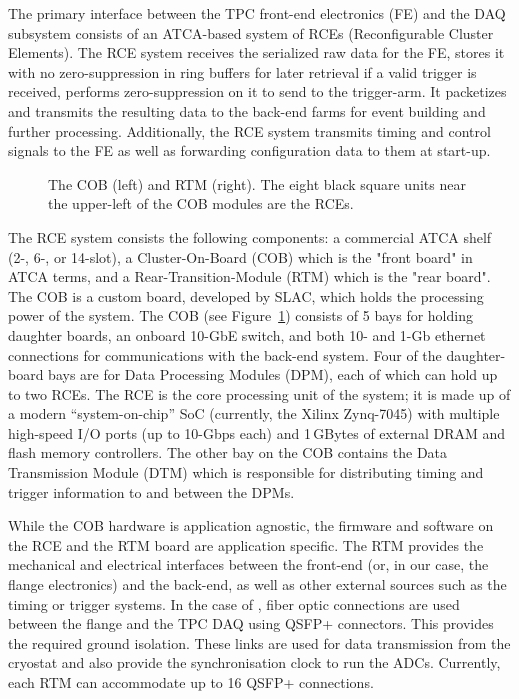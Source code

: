 The primary interface between the TPC front-end electronics (FE) and
the DAQ subsystem consists of an ATCA-based system of RCEs
(Reconfigurable Cluster Elements).  The RCE system receives the
serialized raw data for the FE, stores it with no zero-suppression in 
ring buffers for later retrieval if a valid trigger is received, performs 
zero-suppression on it to send to the trigger-arm.  It packetizes and 
transmits the resulting data to the back-end
farms for event building and further processing.  Additionally,
the RCE system transmits timing and control signals to the FE as well
as forwarding configuration data to them at start-up.

\begin{figure}[hbt]
\begin{center}
  \caption{\label{fig:daq15_cob} The COB (left) and RTM (right). The eight black square units near the upper-left of the COB modules are the RCEs.}
\end{center}
\end{figure}
The RCE system consists the following components: a commercial ATCA
shelf (2-, 6-, or 14-slot), a Cluster-On-Board (COB) which is the
"front board" in ATCA terms, and a Rear-Transition-Module (RTM) which
is the "rear board".  The COB is a custom board, developed by SLAC,
which holds the processing power of the system.  The COB (see
Figure~\ref{fig:daq15_cob}) consists of 5 bays for holding daughter
boards, an onboard 10-GbE switch, and both 10- and 1-Gb ethernet
connections for communications with the back-end system.  Four of the
daughter-board bays are for Data Processing Modules (DPM), each of
which can hold up to two RCEs.  The RCE is the core processing unit of
the system; it is made up of a modern ``system-on-chip'' SoC (currently, the Xilinx
Zynq-7045) with multiple high-speed I/O ports (up to 10-Gbps each) and
1\,GBytes of external DRAM and flash memory controllers.  The
other bay on the COB contains the Data Transmission Module (DTM) which
is responsible for distributing timing and trigger information to and
between the DPMs.

While the COB hardware is application agnostic, the firmware and
software on the RCE and the RTM board are application specific. The
RTM provides the mechanical and electrical interfaces between the
front-end (or, in our case, the flange electronics) and the back-end,
as well as other external sources such as the timing or trigger
systems.  In the case of \LBNE,
fiber optic connections are used between
the flange and the TPC DAQ using QSFP+ connectors. This provides the required ground isolation.  These links are used for data transmission from the cryostat and also provide the synchronisation clock to run the ADCs.  Currently, each
RTM can accommodate up to 16 QSFP+ connections.

